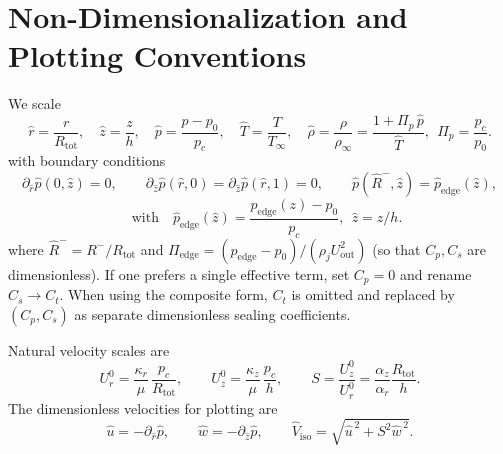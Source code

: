 \documentclass[11pt,a4paper]{article}
\begin{document}
\section{Non-Dimensionalization and Plotting Conventions}
We scale
\begin{equation}
  \hat r=\frac{r}{R_{\mathrm{tot}}},\quad
  \hat z=\frac{z}{h},\quad
  \hat p=\frac{p-p_0}{p_c},\quad
  \hat T=\frac{T}{T_\infty},\quad
  \hat\rho=\frac{\rho}{\rho_\infty}=\frac{1+\Pi_p\,\hat p}{\hat T},\ \ \Pi_p=\frac{p_c}{p_0}.
\end{equation}
with boundary conditions
\begin{equation}
  \partial_{\hat r}\hat p(0,\hat z)=0, \qquad
  \partial_{\hat z}\hat p(\hat r,0)=\partial_{\hat z}\hat p(\hat r,1)=0,\qquad
  \hat p(\hat R^{-},\hat z)= \hat p_{\mathrm{edge}}(\hat z), %
\end{equation}
\begin{equation}
  \quad\text{with}\quad 
\hat p_{\mathrm{edge}}(\hat z) = \frac{p_{\mathrm{edge}}(z)-p_0}{p_c},\ \ \hat z=z/h.
\end{equation}
where $\hat R^{-}=R^{-}/R_{\mathrm{tot}}$ and
$\Pi_{\mathrm{edge}}=(p_{\mathrm{edge}}-p_0)/(\rho_j U_{\mathrm{out}}^2)$ (so that
$C_p,C_s$ are dimensionless). If one prefers a single effective term,
set $C_p=0$ and rename $C_s\to C_t$. When using the composite form, $C_t$ is omitted and replaced by $(C_p,C_s)$ as separate
dimensionless sealing coefficients.

Natural velocity scales are
\begin{equation}
  U_r^0=\frac{\kappa_r}{\mu}\,\frac{p_c}{R_{\mathrm{tot}}},\qquad
  U_z^0=\frac{\kappa_z}{\mu}\,\frac{p_c}{h},\qquad
  S=\frac{U_z^0}{U_r^0}=\frac{\alpha_z}{\alpha_r}\frac{R_{\mathrm{tot}}}{h}.
\end{equation}
The dimensionless velocities for plotting are
\begin{equation}
  \hat u=-\partial_{\hat r}\hat p,\qquad
  \hat w=-\partial_{\hat z}\hat p,\qquad
  \hat V_{\mathrm{iso}}=\sqrt{\hat u^{\,2}+S^{2}\hat w^{\,2}}.
\end{equation}
\end{document}
